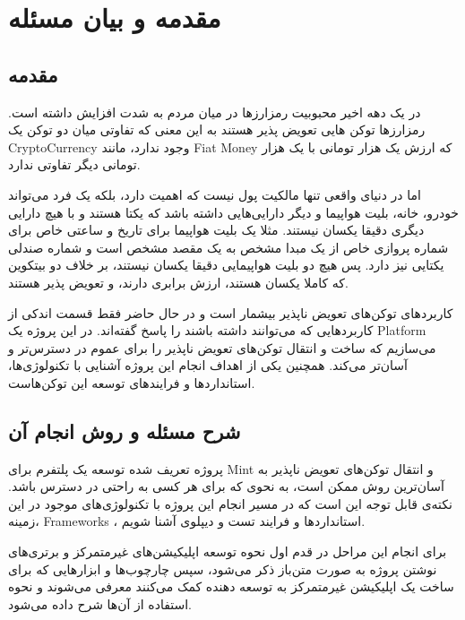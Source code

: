 
\chapter{مقدمه و بیان مسئله}

\section{مقدمه}
در یک دهه اخیر محبوبیت رمزارز‌ها در میان مردم به شدت افزایش داشته است. رمزارزها توکن هایی تعویض پذیر هستند به این معنی که تفاوتی میان دو توکن یک
\gls{CryptoCurrency}
وجود ندارد، مانند
\gls{Fiat Money}
که ارزش یک هزار تومانی با یک هزار تومانی دیگر تفاوتی ندارد.

اما در دنیای واقعی تنها مالکیت پول نیست که اهمیت دارد، بلکه یک فرد می‌تواند خودرو، خانه، بلیت هواپیما و دیگر دارایی‌هایی داشته باشد که یکتا هستند و با هیچ دارایی دیگری دقیقا یکسان نیستند. مثلا یک بلیت هواپیما برای تاریخ و ساعتی خاص برای شماره پروازی خاص از یک مبدا مشخص به یک مقصد مشخص است و شماره صندلی یکتایی نیز دارد. پس هیچ دو بلیت هواپیمایی دقیقا یکسان نیستند، بر خلاف دو بیتکوین که کاملا یکسان هستند، ارزش برابری دارند، و تعویض پذیر هستند.

کاربردهای توکن‌های تعویض ناپذیر بیشمار است و در حال حاضر فقط قسمت اندکی از کاربردهایی که می‌توانند داشته باشند را پاسخ گفته‌اند. در این پروژه یک
\gls{Platform}
می‌سازیم که ساخت و انتقال توکن‌های تعویض ناپذیر را برای عموم در دسترس‌تر و آسان‌تر می‌کند. همچنین یکی از اهداف انجام این پروژه آشنایی با تکنولوژی‌ها، استاندارد‌ها و فرایند‌های توسعه این توکن‌هاست.


\section{شرح مسئله و روش انجام آن}
پروژه تعریف شده توسعه یک پلتفرم برای
\gls{Mint}
و انتقال توکن‌های تعویض ناپذیر به آسان‌ترین روش ممکن است، به نحوی که برای هر کسی به راحتی در دسترس باشد. نکته‌ی قابل توجه‌ این است که در مسیر انجام این پروژه با تکنولوژی‌های موجود در این زمینه، 
\glspl{Framework}
، استاندارد‌ها و فرایند تست و دیپلوی آشنا شویم.

برای انجام این مراحل در قدم اول نحوه توسعه اپلیکیشن‌های غیرمتمرکز و برتری‌های نوشتن پروژه به صورت متن‌باز ذکر می‌شود، سپس چارچوب‌ها و ابزار‌هایی که برای ساخت یک اپلیکیشن غیرمتمرکز به توسعه دهنده کمک می‌کنند معرفی می‌شوند و نحوه استفاده از آن‌ها شرح داده می‌شود.

